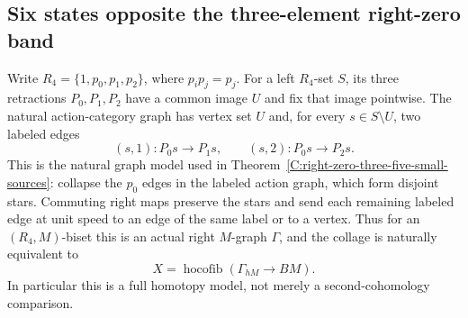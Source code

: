 \subsection{Six states opposite the three-element right-zero band}

Write $R_4=\{1,p_0,p_1,p_2\}$, where $p_ip_j=p_j$.
For a left $R_4$-set $S$, its three retractions $P_0,P_1,P_2$
have a common image $U$ and fix that image pointwise.  The natural
action-category graph has vertex set $U$ and, for every
$s\in S\setminus U$, two labeled edges
\[
 (s,1):P_0s\longrightarrow P_1s,\qquad
 (s,2):P_0s\longrightarrow P_2s.
\]
This is the natural graph model used in
Theorem~\ref{C:right-zero-three-five-small-sources}: collapse the
$p_0$ edges in the labeled action graph, which form disjoint
stars.  Commuting right maps preserve the stars and send each
remaining labeled edge at unit speed to an edge of the same label
or to a vertex.  Thus for an $(R_4,M)$-biset this is an actual
right $M$-graph $\Gamma$, and the collage is naturally equivalent
to
\[
 X=\operatorname{hocofib}(\Gamma_{hM}\longrightarrow BM).
\]
In particular this is a full homotopy model, not merely a
second-cohomology comparison.

